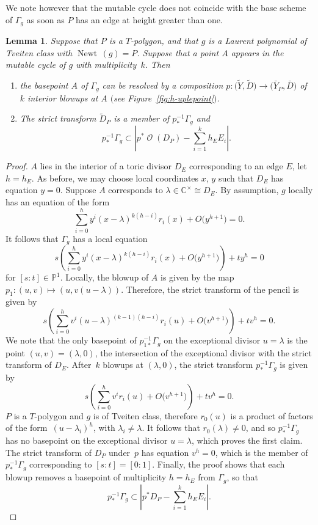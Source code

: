 \documentclass[pdftex]{sigma}
\numberwithin{equation}{section}
\newtheorem{Lemma}[Theorem]{Lemma}
\DeclareMathOperator{\Newt}{{Newt \,}}
\DeclareMathOperator{\cO}{\mathcal{O}}
\newcommand{\CC}{\mathbb{C}}
\newcommand{\PP}{\mathbb{P}}
\begin{document}
We note however that the mutable cycle does not coincide with the base scheme of $\Gamma_g$ as soon as $P$ has an edge at height greater than one.
\begin{Lemma}\label{lem:resolutionofsingularities}
Suppose that $P$ is a $T$-polygon, and that $g$ is a Laurent polynomial of Tveiten class with $\Newt(g)=P$. Suppose that a point $A$ appears in the mutable cycle of $g$ with multiplicity~$k$. Then
\begin{enumerate}\itemsep=0pt
	\item[$(1)$] the basepoint $A$ of $\Gamma_g$ can be resolved by a composition $p \colon \bigl(\tilde{Y}, \tilde{D}\bigr) \rightarrow \bigl(\bar{Y}_P, \bar{D}\bigr)$ of $k$ interior blowups at $A$ $($see Figure~{\rm\ref{fig:h-uplepoint}}$)$.
	\item[$(2)$] The strict transform $\tilde{D}_P$ is a member of $p_*^{-1}\Gamma_g$ and
	\[p_*^{-1}\Gamma_g \subset \left|p^*\cO(D_P)-\sum_{i=1}^{k} h_E E_i\right|.
	\]
\end{enumerate}
\end{Lemma}
\begin{proof}
$A$ lies in the interior of a toric divisor $D_E$ corresponding to an edge $E$, let $h=h_E$.
As before, we may choose local coordinates $x$, $y$ such that $D_E$ has equation $y=0$. Suppose $A$ corresponds to $\lambda \in \CC^\times \cong D_E$. By assumption, $g$ locally has an equation of the form
\[
\sum_{i=0}^h y^i(x-\lambda)^{k(h-i)}r_i(x)+O\bigl(y^{h+1}\bigr)=0.
\]
It follows that $\Gamma_g$ has a local equation
\[
s\left(\sum_{i=0}^h y^i(x-\lambda)^{k(h-i)}r_i(x)+O\bigl(y^{h+1}\bigr)\right)+ty^h=0
\]
for $[s:t]\in \PP^1$.
Locally, the blowup of $A$ is given by the map $p_1 \colon (u,v) \mapsto (u, v(u-\lambda))$. Therefore, the strict transform of the pencil is given by
 \[
s\left(\sum_{i=0}^h v^i(u-\lambda)^{(k-1)(h-i)}r_i(u)+O\bigl(v^{h+1}\bigr)\right)+tv^h=0.
 \]
We note that the only basepoint of $p_{1*}^{-1}\Gamma_g$ on the exceptional divisor $u=\lambda$ is the point ${(u,v)=(\lambda, 0)}$, the intersection of the exceptional divisor with the strict transform of $D_E$.
After~$k$ blowups at $(\lambda, 0)$, the strict transform $p_*^{-1}\Gamma_g$ is given by
 \[
 s\left(\sum_{i=0}^h v^ir_i(u)+O\bigl(v^{h+1}\bigr)\right)+tv^h=0.
 \]
 $P$ is a $T$-polygon and $g$ is of Tveiten class, therefore $r_0(u)$ is a product of factors of the form~${(u-\lambda_i)^h}$, with $\lambda_i \neq \lambda$. It follows that $r_0(\lambda) \neq 0$, and so $p_*^{-1}\Gamma_g$ has no basepoint on the exceptional divisor $u=\lambda$, which proves the first claim.
The strict transform of $D_P$ under~$p$ has equation $v^h=0$, which is the member of $p_{*}^{-1}\Gamma_g$ corresponding to $[s:t]=[0:1]$. Finally, the proof shows that each blowup removes a basepoint of multiplicity $h=h_E$ from $\Gamma_g$, so that%
	\[
	p_*^{-1}\Gamma_g \subset \left|p^*D_P-\sum_{i=1}^{k} h_E E_i\right|.\tag*{\qed}
\] \renewcommand{\qed}{}
\end{proof}
\end{document}
